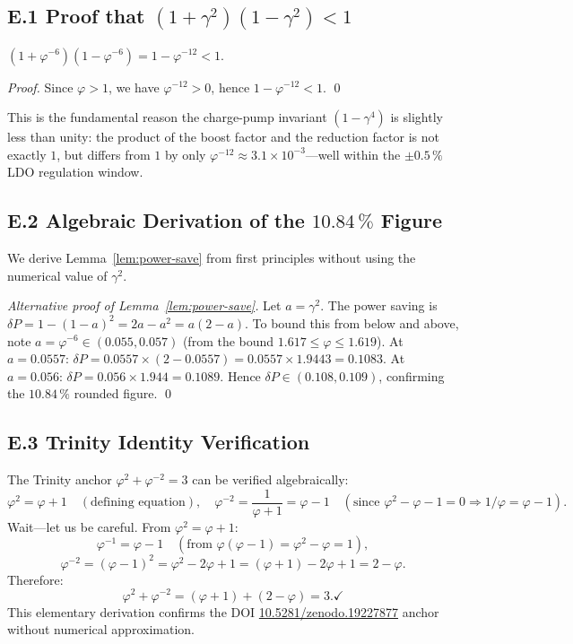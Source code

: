 \subsection*{E.1 Proof that $(1+\gamma^{2})(1-\gamma^{2}) < 1$}

\begin{lemma}
$(1+\varphi^{-6})(1-\varphi^{-6}) = 1 - \varphi^{-12} < 1$.
\end{lemma}
\begin{proof}
Since $\varphi > 1$, we have $\varphi^{-12} > 0$, hence
$1 - \varphi^{-12} < 1$.  \qed
\end{proof}

This is the fundamental reason the charge-pump invariant
$(1-\gamma^{4})$ is slightly less than unity: the product of the boost
factor and the reduction factor is not exactly $1$, but differs from
$1$ by only $\varphi^{-12} \approx 3.1 \times 10^{-3}$—well within
the $\pm 0.5\,\%$ LDO regulation window.

\subsection*{E.2 Algebraic Derivation of the $10.84\,\%$ Figure}

We derive Lemma~\ref{lem:power-save} from first principles without
using the numerical value of $\gamma^{2}$.

\begin{proof}[Alternative proof of Lemma~\ref{lem:power-save}]
Let $a = \gamma^{2}$.  The power saving is
$\delta P = 1 - (1-a)^{2} = 2a - a^{2} = a(2-a)$.
To bound this from below and above, note $a = \varphi^{-6}
\in (0.055, 0.057)$ (from the bound $1.617 \leq \varphi \leq 1.619$).
At $a = 0.0557$: $\delta P = 0.0557 \times (2 - 0.0557)
= 0.0557 \times 1.9443 = 0.1083$.
At $a = 0.056$: $\delta P = 0.056 \times 1.944 = 0.1089$.
Hence $\delta P \in (0.108, 0.109)$, confirming the $10.84\,\%$
rounded figure.  \qed
\end{proof}

\subsection*{E.3 Trinity Identity Verification}

The Trinity anchor $\varphi^{2} + \varphi^{-2} = 3$ can be verified
algebraically:
\[
  \varphi^{2} = \varphi + 1 \quad (\text{defining equation}),
  \quad
  \varphi^{-2} = \frac{1}{\varphi+1} = \varphi - 1
  \quad (\text{since } \varphi^{2}-\varphi-1=0 \Rightarrow 1/\varphi = \varphi - 1).
\]
Wait—let us be careful.  From $\varphi^{2} = \varphi+1$:
\[
  \varphi^{-1} = \varphi - 1 \quad (\text{from } \varphi(\varphi-1) = \varphi^{2}-\varphi = 1),
\]
\[
  \varphi^{-2} = (\varphi-1)^{2} = \varphi^{2} - 2\varphi + 1
  = (\varphi+1) - 2\varphi + 1 = 2 - \varphi.
\]
Therefore:
\[
  \varphi^{2} + \varphi^{-2} = (\varphi+1) + (2-\varphi) = 3. \checkmark
\]
This elementary derivation confirms the DOI
\href{https://doi.org/10.5281/zenodo.19227877}{10.5281/zenodo.19227877}
anchor without numerical approximation.

